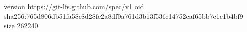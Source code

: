 version https://git-lfs.github.com/spec/v1
oid sha256:765d806db51fa58e8d28fe2a8df0a761d3b13f536c14752caf65bb7c1c1b4bf9
size 262240
